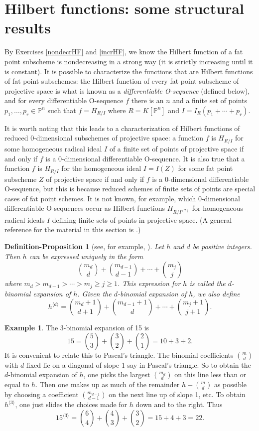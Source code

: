 \documentclass[11pt,twoside]{amsart}
\numberwithin{equation}{section}
\newtheorem{def-prop}[theorem]{Definition-Proposition}
\theoremstyle{definition}
\newtheorem{example}[theorem]{Example}
\begin{document}
\section{Hilbert functions: some structural results}

By Exercises \ref{nondecrHF} and \ref{incrHF}, we know the Hilbert function of a fat point 
subscheme is nondecreasing in a strong way (it is strictly increasing until it is constant).
It is possible to characterize the functions that are Hilbert functions of fat point subschemes:
the Hilbert function of every fat point subscheme of projective space
is what is known as a \emph{differentiable O-sequence} (defined below), and 
for every differentiable O-sequence $f$
there is an $n$ and a finite set of points $p_1,\ldots,p_r\in{\mathbb{P}^{n}}$ such that
$f=H_{R/I}$ where $R={K}[{\mathbb{P}^{n}}]$ and $I=I_R(p_1+\cdots+p_r)$.

It is worth noting that this leads to a characterization of Hilbert functions of
reduced 0-dimensional subschemes of projective space:
a function $f$ is $H_{R/I}$ for some homogeneous radical ideal $I$ of a finite set of 
points of projective space if and only if $f$ is a 0-dimensional 
differentiable O-sequence.
It is also true that a function $f$ is $H_{R/I}$ for the homogeneous ideal 
$I=I(Z)$ for some fat point subscheme $Z$  
of projective space if and only if $f$ is a 0-dimensional 
differentiable O-sequence, but this is because reduced schemes of finite sets of points
are special cases of fat point schemes.
It is not known, for example, which 0-dimensional differentiable 
O-sequences occur
as Hilbert functions $H_{R/I^{(2)}}$ for homogeneous radical ideals
$I$ defining finite sets of points in projective space.
(A general reference for the material in this section is \cite{refBH}.)

\begin{def-prop}[see, for example, \cite{refGK}]
Let $h$ and $d$ be positive integers.  Then $h$ can be expressed uniquely in the form
$$\binom{m_d}{d} + \binom{m_{d-1}}{d-1} + \cdots + \binom{m_j}{j}$$
where $m_d > m_{d-1} > \cdots > m_j \geq j \geq 1$.  This expression for $h$ is called the \emph{$d$-binomial expansion of $h$}.  Given the $d$-binomial expansion of $h$, we also define
$$h^{\langle d \rangle} = \binom{m_d+1}{d+1} + \binom{m_{d-1}+1}{d} + \cdots + \binom{m_j+1}{j+1}.$$
\end{def-prop}

\begin{example}
The 3-binomial expansion of 15 is
$$15 = \binom{5}{3} + \binom{3}{2} + \binom{2}{1} = 10 + 3 + 2.$$
It is convenient to relate this to Pascal's triangle.
The binomial coefficients $\binom{m}{d}$ with $d$ fixed lie on a diagonal
of slope 1 say in Pascal's triangle. So to obtain the $d$-binomial expansion
of $h$, one picks the largest $\binom{m_d}{d}$ on this line less than or equal to $h$.
Then one makes up as much of the remainder $h-\binom{m}{d}$ as possible
by choosing a coefficient $\binom{m_{d-1}}{d-1}$ on the next line up of slope 1, etc.
To obtain $h^{\langle 3 \rangle}$, one just slides the choices made  for $h$
down and to the right. Thus
$$15^{\langle 3 \rangle} = \binom{6}{4} + \binom{4}{3} + \binom{3}{2} = 15 + 4 + 3 = 22.$$
\end{example}
\end{document}
